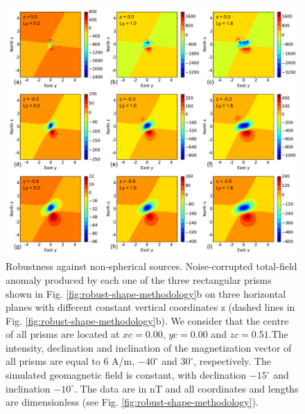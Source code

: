 \documentclass[journal abbreviation, npg]{copernicus}
\begin{document}
\begin{figure}[t]
\vspace*{2mm}
\begin{center}
\includegraphics[width=12cm]{Figures/Fig5.pdf}
\end{center}
\caption{Robustness against non-spherical sources. Noise-corrupted total-field anomaly produced by each one of the three rectangular prisms shown in Fig. \ref{fig:robust-shape-methodology}b on three horizontal planes with different constant vertical coordinates z (dashed lines in Fig. \ref{fig:robust-shape-methodology}b). We consider that the centre of all prisms are located at $xc = 0.00$, $yc = 0.00$ and $zc = 0.51$.The intensity, declination and inclination of the magnetization vector of all prisms are equal to $6$ A/m, $-40^{\circ}$ and $30^{\circ}$, respectively. The simulated geomagnetic field is constant, with declination $-15^{\circ}$ and inclination $-10^{\circ}$. The data are in nT and all coordinates and lengths are dimensionless (see Fig. \ref{fig:robust-shape-methodology}).} 
\label{fig:robust-shape-data}
\end{figure}
\end{document}
